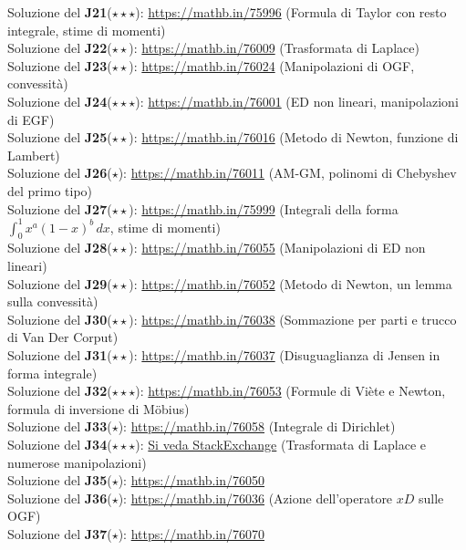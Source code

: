 \documentclass[a4paper,twoside]{article}
\theoremstyle{definition}
\numberwithin{theorem}{section}
\begin{document}
Soluzione del \textbf{J21}($\star\star\star$): \url{https://mathb.in/75996} (Formula di Taylor con resto integrale, stime di momenti)\\
Soluzione del \textbf{J22}($\star\star$): \url{https://mathb.in/76009} (Trasformata di Laplace)\\
Soluzione del \textbf{J23}($\star\star$): \url{https://mathb.in/76024} (Manipolazioni di OGF, convessità)\\
Soluzione del \textbf{J24}($\star\star\star$): \url{https://mathb.in/76001} (ED non lineari, manipolazioni di EGF) \\
Soluzione del \textbf{J25}($\star\star$): \url{https://mathb.in/76016} (Metodo di Newton, funzione di Lambert)\\
Soluzione del \textbf{J26}($\star$): \url{https://mathb.in/76011} (AM-GM, polinomi di Chebyshev del primo tipo) \\
Soluzione del \textbf{J27}($\star\star$): \url{https://mathb.in/75999} (Integrali della forma $\int_{0}^{1}x^a(1-x)^b\,dx$, stime di momenti)\\
Soluzione del \textbf{J28}($\star\star$): \url{https://mathb.in/76055} (Manipolazioni di ED non lineari) \\
Soluzione del \textbf{J29}($\star\star$): \url{https://mathb.in/76052} (Metodo di Newton, un lemma sulla convessità)\\
Soluzione del \textbf{J30}($\star\star$): \url{https://mathb.in/76038} (Sommazione per parti e trucco di Van Der Corput)\\
Soluzione del \textbf{J31}($\star\star$): \url{https://mathb.in/76037} (Disuguaglianza di Jensen in forma integrale)\\
Soluzione del \textbf{J32}($\star\star\star$): \url{https://mathb.in/76053} (Formule di Viète e Newton, formula di inversione di M\"obius)  \\
Soluzione del \textbf{J33}($\star$): \url{https://mathb.in/76058} (Integrale di Dirichlet)\\
Soluzione del \textbf{J34}($\star\star\star$): \href{https://math.stackexchange.com/questions/2442091/a-ramanujan-sum/2442175#2442175}{Si veda StackExchange} (Trasformata di Laplace e numerose manipolazioni)\\
Soluzione del \textbf{J35}($\star$): \url{https://mathb.in/76050} \\
Soluzione del \textbf{J36}($\star$): \url{https://mathb.in/76036} (Azione dell'operatore $xD$ sulle OGF)\\
Soluzione del \textbf{J37}($\star$): \url{https://mathb.in/76070}\\
\end{document}
